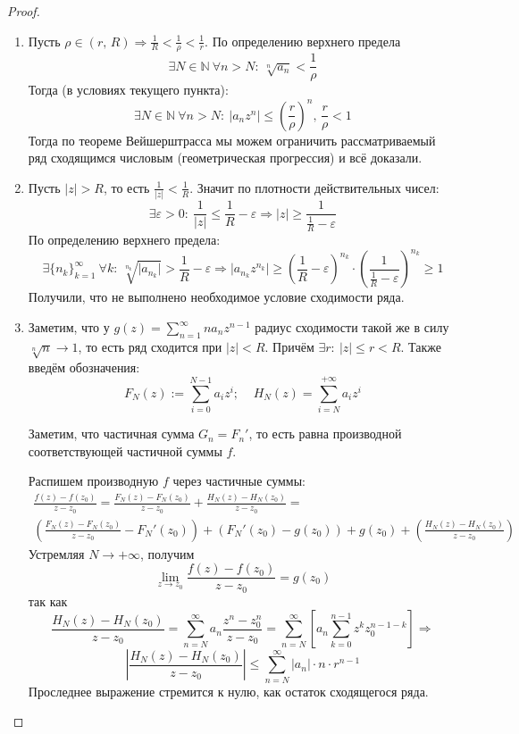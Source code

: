 \documentclass[a4paper,12pt]{article}
\renewcommand{\leq}{\ensuremath{\leqslant}}
\renewcommand{\geq}{\ensuremath{\geqslant}}
\theoremstyle{plain}
\theoremstyle{definition}
\theoremstyle{remark}
\begin{document}
\begin{proof}
	\begin{enumerate}
		\item Пусть $\rho \in (r,\, R) \Rightarrow \frac{1}{R} < \frac{1}{\rho} < \frac{1}{r}$. По определению верхнего предела
		      \[
			      \exists N \in \mathbb{N} \: \forall n > N :\: \sqrt[n]{a_n} < \frac{1}{\rho}
		      \]
		      Тогда (в условиях текущего пункта):
		      \[
			      \exists N \in \mathbb{N} \: \forall n > N :\: \vert a_nz^n\vert \leq \left(\frac{r}{\rho}\right)^n,\, \frac{r}{\rho} < 1
		      \]
		      Тогда по теореме Вейшерштрасса мы можем ограничить рассматриваемый ряд сходящимся числовым (геометрическая прогрессия) и всё доказали.
		\item Пусть $\vert z\vert > R$, то есть $\frac{1}{\vert z\vert} < \frac{1}{R}$. Значит по плотности действительных чисел:
		      \[
			      \exists \varepsilon > 0 :\: \frac{1}{\vert z\vert} \leq \frac{1}{R} - \varepsilon \Rightarrow \vert z\vert \geq \frac{1}{\frac{1}{R} - \varepsilon}
		      \]
		      По определению верхнего предела:
		      \[
			      \exists \{n_k\}_{k = 1}^\infty \: \forall k :\: \sqrt[n_k]{\vert a_{n_k}\vert} > \frac{1}{R} - \varepsilon \Rightarrow \vert a_{n_k}z^{n_k}\vert \geq \left(\frac{1}{R} - \varepsilon\right)^{n_k}\cdot\left(\frac{1}{\frac{1}{R} - \varepsilon}\right)^{n_k} \geq 1
		      \]
		      Получили, что не выполнено необходимое условие сходимости ряда.
		\item Заметим, что у $g(z) = \sum_{n = 1}^\infty na_nz^{n-1}$ радиус сходимости такой же в силу $\sqrt[n]{n} \to 1$, то есть ряд сходится при $\vert z\vert < R$. Причём $\exists r :\: \vert z\vert \leq r < R$. Также введём обозначения:
		\[
			F_N(z) := \sum_{i = 0}^{N - 1} a_iz^i;\;\;\;\; H_N(z) = \sum_{i = N}^{+\infty} a_iz^i
		\]

		      Заметим, что частичная сумма $G_n = F_n'$, то есть равна производной соответствующей частичной суммы $f$.

		      Распишем производную $f$ через частичные суммы:
		      \begin{align*}
			      \frac{f(z) - f(z_0)}{z - z_0} = \frac{F_N(z) - F_N(z_0)}{z - z_0} + \frac{H_N(z) - H_N(z_0)}{z - z_0} = \\
			      \left(\frac{F_N(z) - F_N(z_0)}{z - z_0}  - F_N'(z_0)\right) + (F_N'(z_0) - g(z_0)) + g(z_0) + \left(\frac{H_N(z) - H_N(z_0)}{z - z_0}\right)
		      \end{align*}
		      Устремляя $N \to +\infty$, получим
		      \[
			      \lim_{z \to z_0} \frac{f(z) - f(z_0)}{z - z_0} = g(z_0)
		      \]
		      так как
		      \[
			      \frac{H_N(z) - H_N(z_0)}{z - z_0} = \sum_{n = N}^\infty a_n\frac{z^n - z^n_0}{z - z_0} = \sum_{n = N}^\infty \left[a_n\sum_{k =0}^{n-1}z^kz_0^{n - 1 - k}\right] \Rightarrow
		      \]
		      \[
			      \left\vert\frac{H_N(z) - H_N(z_0)}{z - z_0}\right\vert \leq \sum_{n = N}^\infty \vert a_n\vert\cdot n\cdot r^{n - 1}
		      \]
		      Проследнее выражение стремится к нулю, как остаток сходящегося ряда.
	\end{enumerate}

\end{proof}
\end{document}
